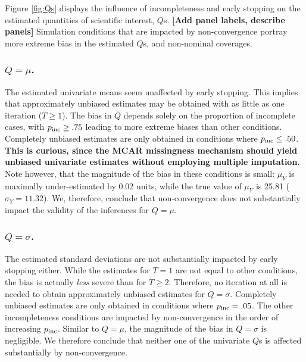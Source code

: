 \documentclass[Royal,times,sageh]{sagej}
\begin{document}
Figure \ref{fig:Qs} displays the influence of incompleteness and early stopping on the estimated quantities of scientific interest, \(Q\)s. \textbf{{[}Add panel labels, describe panels{]}} Simulation conditions that are impacted by non-convergence portray more extreme bias in the estimated \(Q\)s, and non-nominal coverages.

\hypertarget{qmu.}{%
\subsubsection{\texorpdfstring{\(Q=\mu\).}{Q=\textbackslash mu.}}\label{qmu.}}

The estimated univariate means seem unaffected by early stopping. This implies that approximately unbiased estimates may be obtained with as little as one iteration (\(T \geq 1\)). The bias in \(\bar{Q}\) depends solely on the proportion of incomplete cases, with \(p_{\rm inc}\geq.75\) leading to more extreme biases than other conditions. Completely unbiased estimates are only obtained in conditions where \(p_{\rm inc}\leq.50\). \textbf{This is curious, since the MCAR missingness mechanism should yield unbiased univariate estimates without employing multiple imputation.} Note however, that the magnitude of the bias in these conditions is small: \(\mu_Y\) is maximally under-estimated by 0.02 units, while the true value of \(\mu_Y\) is 25.81 (\(\sigma_Y = 11.32\)). We, therefore, conclude that non-convergence does not substantially impact the validity of the inferences for \(Q=\mu\).

\hypertarget{qsigma.}{%
\subsubsection{\texorpdfstring{\(Q=\sigma\).}{Q=\textbackslash sigma.}}\label{qsigma.}}

The estimated standard deviations are not substantially impacted by early stopping either. While the estimates for \(T=1\) are not equal to other conditions, the bias is actually \emph{less} severe than for \(T\geq2\). Therefore, no iteration at all is needed to obtain approximately unbiased estimates for \(Q=\sigma\). Completely unbiased estimates are only obtained in conditions where \(p_{\rm inc}=.05\). The other incompleteness conditions are impacted by non-convergence in the order of increasing \(p_{\rm inc}\). Similar to \(Q=\mu\), the magnitude of the bias in \(Q=\sigma\) is negligible. We therefore conclude that neither one of the univariate \(Q\)s is affected substantially by non-convergence.
\end{document}
